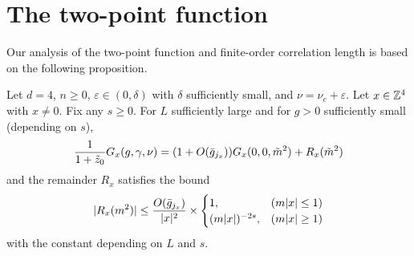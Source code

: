 
\section{The two-point function}

Our analysis of the two-point function and finite-order correlation length is
based on the following proposition.

\begin{prop}
\label{prop:R}
Let $d=4$, $n \ge 0$, $\varepsilon \in (0,\delta)$ with $\delta$ sufficiently small,
and $\nu = \nu_c + \varepsilon$.
Let $x \in {\mathbb Z}^4$ with $x \neq 0$.
Fix any $s \geq 0$.
For $L$ sufficiently large and for $g > 0$ sufficiently small (depending on $s$),
\begin{equation}
\label{e:Gab-to-sum-Rqj}
\frac{1}{1+\tilde z_0} G_x(g, \gamma, \nu)
	=
(1 + O(\bar{g}_{j_x})) G_x(0, 0, \tilde m^2) + R_x(\tilde m^2)
\end{equation}
and the remainder $R_x$ satisfies the bound
\begin{equation}
\label{e:Rab-bound}
|R_{x}(m^2)|
	\le
\frac{O(\bar{g}_{j_{x}}) }{|x|^2}
	\times
\begin{cases}
1,				& (m|x|\le 1) \\
(m|x|)^{-2s},	& (m|x|\ge 1)
\end{cases}
\end{equation}
with the  constant depending on $L$ and $s$.
\end{prop}

